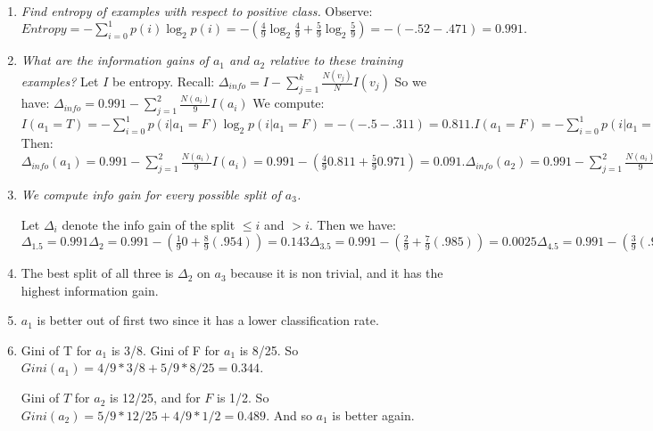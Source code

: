 \documentclass{amsbook}
\theoremstyle{plain}
\numberwithin{section}{chapter}
\numberwithin{equation}{chapter}
\theoremstyle{definition}
\theoremstyle{remark}
\newcommand{\fracc}{\frac}
\newcommand{\lpar}{\left(}
\newcommand{\rpar}{\right)}
\begin{document}
\begin{enumerate}
\item \textit{Find entropy of examples with respect to positive class. }
Observe:
$
Entropy = -\sum_{i = 0}^1 p(i)\log_2 p(i)
= -\lpar \fracc{4}{9}\log_2\fracc{4}{9}  + \fracc{5}{9}\log_2\fracc{5}{9}\rpar
= -\lpar -.52 - .471 \rpar
= 0.991.
$

\item \textit{What are the information gains of $a_1$ and $a_2$ relative to these training examples? }
Let $I$ be entropy. 
Recall:
$
\Delta_{info} = I - \sum_{j = 1}^k \fracc{N(v_j)}{N}I(v_j)
$
So we have:
$
\Delta_{info} = 0.991 - \sum_{j = 1}^2 \fracc{N(a_i)}{9}I(a_i)
$
We compute:
$
I(a_1 = T) = -\sum_{i = 0}^1 p(i|a_1 = F)\log_2 p(i|a_1= F)
= -\lpar -.5  - .311\rpar
= 0.811.
I(a_1 = F) = -\sum_{i = 0}^1 p(i|a_1=F)\log_2 p(i|a_1=F)
= 0.971
I(a_2=T) = -\sum_{i = 0}^1 p(i|a_2=T)\log_2 p(i|a_2=T)
= -\lpar -.529  - .442\rpar
= 0.971
I(a_2=F) = -\sum_{i = 0}^1 p(i|a_2=F)\log_2 p(i|a_2=F)
= 1.
$
Then:
$
\Delta_{info}(a_1) = 0.991 - \sum_{j = 1}^2 \fracc{N(a_i)}{9}I(a_i)
= 0.991 - \lpar \fracc{4}{9}0.811 + \fracc{5}{9}0.971 \rpar
= 0.091.
\Delta_{info}(a_2) = 0.991 - \sum_{j = 1}^2 \fracc{N(a_i)}{9}I(a_i)
= 0.991 - \lpar \fracc{4}{9}1 + \fracc{5}{9}0.971 \rpar
= 0.016.
$

\item \textit{We compute info gain for every possible split of $a_3$. }

Let $\Delta_i$ denote the info gain of the split $\leq i$ and $>i$. 
Then we have:
$
\Delta_{1.5} 
= 0.991
\Delta_2 = 0.991 - \lpar \fracc{1}{9}0 + \fracc{8}{9}(.954) \rpar
= 0.143
\Delta_{3.5} = 0.991 - \lpar \fracc{2}{9} + \fracc{7}{9}(.985) \rpar
= 0.0025
\Delta_{4.5} = 0.991 - \lpar \fracc{3}{9}(.918) + \fracc{6}{9}(.918) \rpar
= 0.073
\Delta_{5.5} = 0.991 - \lpar \fracc{5}{9}(.971) + \fracc{4}{9} \rpar
= 0.0071
\Delta_{6.5} = 0.991 - \lpar \fracc{6}{9} + \fracc{3}{9}(.918) \rpar
= 0.018
\Delta_{7.5} = 0.991 - \lpar \fracc{8}{9}0 + \fracc{1}{9}0 \rpar
= 0.991
\Delta_{8.5} 
= 0.991.
$

\item 
The best split of all three is $\Delta_2$ on $a_3$ because it is non trivial, and it has the highest information gain. 

\item $a_1$ is better out of first two since it has a lower classification rate. 

\item Gini of T for $a_1$ is 3/8. Gini of F for $a_1$ is 8/25. So $Gini(a_1) = 4/9 * 3/8 + 5/9 * 8/25 = 0.344$. 

Gini of $T$ for $a_2$ is 12/25, and for $F$ is 1/2. So $Gini(a_2) = 5/9 * 12/25 + 4/9 * 1/2 = 0.489$. And so $a_1$ is better again. 
\end{enumerate}






















\appendix
%

\backmatter


\printindex
\end{document}
